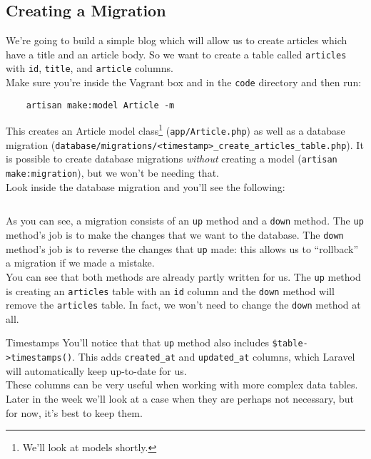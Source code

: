 \subsection{Creating a Migration}

We're going to build a simple blog which will allow us to create articles which have a title and an article body. So we want to create a table called \texttt{articles} with \texttt{id}, \texttt{title}, and \texttt{article} columns.
\\

Make sure you're inside the Vagrant box and in the \texttt{code} directory and then run:

\begin{verbatim}
    artisan make:model Article -m
\end{verbatim}

This creates an Article model class\footnote{We'll look at models shortly.} (\texttt{app/Article.php}) as well as a database migration (\texttt{database/migrations/<timestamp>\_create\_articles\_table.php}). It is possible to create database migrations \textit{without} creating a model (\texttt{artisan make:migration}), but we won't be needing that.
\\

Look inside the database migration and you'll see the following:

\inputminted{php}{08-eloquent/figures/01-migration.php}

As you can see, a migration consists of an \texttt{up} method and a \texttt{down} method. The \texttt{up} method's job is to make the changes that we want to the database. The \texttt{down} method's job is to reverse the changes that \texttt{up} made: this allows us to ``rollback'' a migration if we made a mistake.
\\

You can see that both methods are already partly written for us. The \texttt{up} method is creating an \texttt{articles} table with an \texttt{id} column and the \texttt{down} method will remove the \texttt{articles} table. In fact, we won't need to change the \texttt{down} method at all.

\begin{infobox}{Timestamps}
    You'll notice that that \texttt{up} method also includes \texttt{\$table->timestamps()}. This adds \texttt{created\_at} and \texttt{updated\_at} columns, which Laravel will automatically keep up-to-date for us.
    \\

    These columns can be very useful when working with more complex data tables. Later in the week we'll look at a case when they are perhaps not necessary, but for now, it's best to keep them.
\end{infobox}

